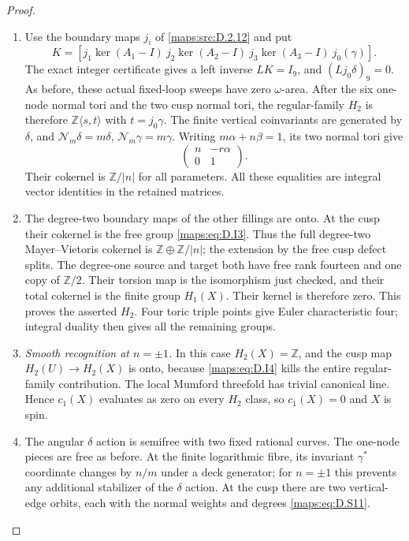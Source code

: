 \begin{proof}
\begin{enumerate}[label=\arabic*.,leftmargin=*]
\item Use the boundary maps $j_i$ of \ref{maps:src:D.2.12} and put
\[
 K=[j_1\ker(A_1-I)\ j_2\ker(A_2-I)
       \ j_3\ker(A_3-I)\ j_0(\gamma)].
\]
The exact integer certificate gives a left inverse
$LK=I_9$, and $(Lj_0\delta)_9=0$.
As before, these actual fixed-loop sweeps have zero
$\omega$-area. After the six one-node normal tori and
the two cusp normal tori, the regular-family $H_2$ is
therefore $\mathbb Z\langle s,t\rangle$ with
$t=j_0\gamma$.
The finite vertical coinvariants are generated by
$\delta$, and
$\mathcal N_m\delta=m\delta$,
$\mathcal N_m\gamma=m\gamma$.
Writing $m\alpha+n\beta=1$, its two normal tori give
\[
                        \begin{pmatrix}n&-r\alpha\\0&1\end{pmatrix}.
 \tag{D.I4}\label{maps:eq:D.I4}
\]
Their cokernel is $\mathbb Z/|n|$ for all parameters.
All these equalities are integral vector identities in
the retained matrices.

\item The degree-two boundary maps of the other fillings are
onto. At the cusp their cokernel is the free group
\eqref{maps:eq:D.I3}. Thus the full degree-two Mayer--Vietoris cokernel
is $\mathbb Z\oplus\mathbb Z/|n|$; the extension by
the free cusp defect splits. The degree-one source and
target both have free rank fourteen and one copy of
$\mathbb Z/2$. Their torsion map is the isomorphism
just checked, and their total cokernel is the finite
group $H_1(X)$. Their kernel is therefore zero.
This proves the asserted $H_2$. Four toric triple points
give Euler characteristic four; integral duality then
gives all the remaining groups.

\item \emph{Smooth recognition at $n=\pm1$.}
In this case $H_2(X)=\mathbb Z$, and the cusp map
$H_2(U)\to H_2(X)$ is onto, because \eqref{maps:eq:D.I4} kills the
entire regular-family contribution. The local Mumford
threefold has trivial canonical line. Hence $c_1(X)$
evaluates as zero on every $H_2$ class, so $c_1(X)=0$
and $X$ is spin.

\item The angular $\delta$ action is semifree with two fixed
rational curves. The one-node pieces are free as before.
At the finite logarithmic fibre, its invariant
$\gamma^*$ coordinate changes by $n/m$ under a deck
generator; for $n=\pm1$ this prevents any additional
stabilizer of the $\delta$ action. At the cusp there
are two vertical-edge orbits, each with the normal
weights and degrees \eqref{maps:eq:D.S11}.


\end{enumerate}
\end{proof}
